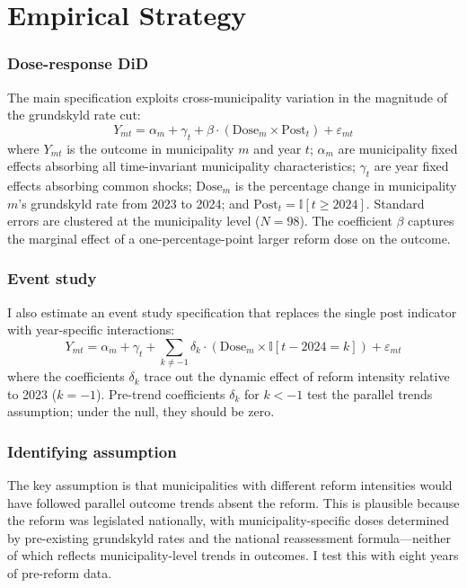 \documentclass[12pt]{article}
\newcommand{\ind}{\mathbb{I}}
\begin{document}


\section{Empirical Strategy}

\subsubsection*{Dose-response DiD} The main specification exploits cross-municipality variation in the magnitude of the grundskyld rate cut:
\begin{equation}\label{eq:main}
    Y_{mt} = \alpha_m + \gamma_t + \beta \cdot (\text{Dose}_m \times \text{Post}_t) + \varepsilon_{mt}
\end{equation}
where $Y_{mt}$ is the outcome in municipality $m$ and year $t$; $\alpha_m$ are municipality fixed effects absorbing all time-invariant municipality characteristics; $\gamma_t$ are year fixed effects absorbing common shocks; $\text{Dose}_m$ is the percentage change in municipality $m$'s grundskyld rate from 2023 to 2024; and $\text{Post}_t = \ind[t \geq 2024]$. Standard errors are clustered at the municipality level ($N = 98$). The coefficient $\beta$ captures the marginal effect of a one-percentage-point larger reform dose on the outcome.

\subsubsection*{Event study} I also estimate an event study specification that replaces the single post indicator with year-specific interactions:
\begin{equation}\label{eq:es}
    Y_{mt} = \alpha_m + \gamma_t + \sum_{k \neq -1} \delta_k \cdot (\text{Dose}_m \times \ind[t - 2024 = k]) + \varepsilon_{mt}
\end{equation}
where the coefficients $\delta_k$ trace out the dynamic effect of reform intensity relative to 2023 ($k = -1$). Pre-trend coefficients $\delta_k$ for $k < -1$ test the parallel trends assumption; under the null, they should be zero.

\subsubsection*{Identifying assumption} The key assumption is that municipalities with different reform intensities would have followed parallel outcome trends absent the reform. This is plausible because the reform was legislated nationally, with municipality-specific doses determined by pre-existing grundskyld rates and the national reassessment formula---neither of which reflects municipality-level trends in outcomes. I test this with eight years of pre-reform data.
\end{document}
